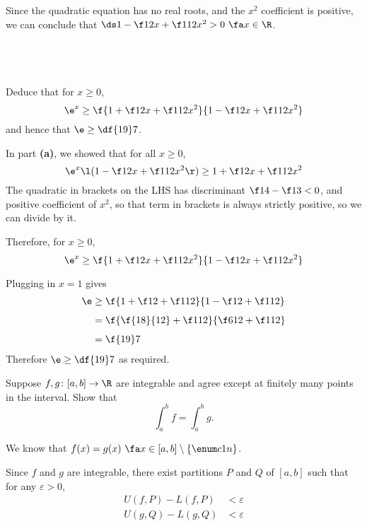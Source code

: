 \documentclass[a4paper]{article}
\begin{document}
Since the quadratic equation has no real roots, and the $x^2$ coefficient is positive, we can conclude that $\ds 1 - \f12 x + \f1{12} x^2 > 0\ \fa x \in \R$.

\subsection{~} %

\begin{questionbody}
Deduce that for $x \ge 0$, \[
\e^x \ge \f{1 + \f12 x + \f1{12} x^2}{1 - \f12 x + \f1{12} x^2}
\] and hence that $\e \ge \df{19}7$.
\end{questionbody}

In part \textbf{(a)}, we showed that for all $x \ge 0$, \[
\e^x \l( 1 - \f12 x + \f1{12} x^2 \r) \ge 1 + \f12 x + \f1{12} x^2
\] The quadratic in brackets on the LHS has discriminant $\f14 - \f13 < 0$, and positive coefficient of $x^2$, so that term in brackets is always strictly positive, so we can divide by it.

Therefore, for $x \ge 0$, \[ \e^x \ge \f{1 + \f12 x + \f1{12} x^2}{1 - \f12 x + \f1{12} x^2} \]

Plugging in $x=1$ gives \begin{align*}
\e &\ge \f{1 + \f12 + \f1{12}}{1 - \f12 + \f1{12}} \\[1ex]
&= \f{\f{18}{12} + \f1{12}}{\f6{12} + \f1{12}} \\[1ex]
&= \f{19}7
\end{align*}
Therefore $\e \ge \df{19}7$ as required.



\begin{questionbody}
Suppose $f, g \colon [a, b] \to \R$ are integrable and agree except at finitely many points in the interval. Show that \[
\int_a^b f = \int_a^b g.
\]
\end{questionbody}

We know that $f(x) = g(x) \ \fa x \in [a,b] \setminus \{\enum c1n\}$.


Since $f$ and $g$ are integrable, there exist partitions $P$ and $Q$ of $[a,b]$ such that for any $\varepsilon > 0$, \begin{align*}
U(f, P) - L(f, P) &< \varepsilon \\
U(g, Q) - L(g, Q) &< \varepsilon
\end{align*}
\end{document}
